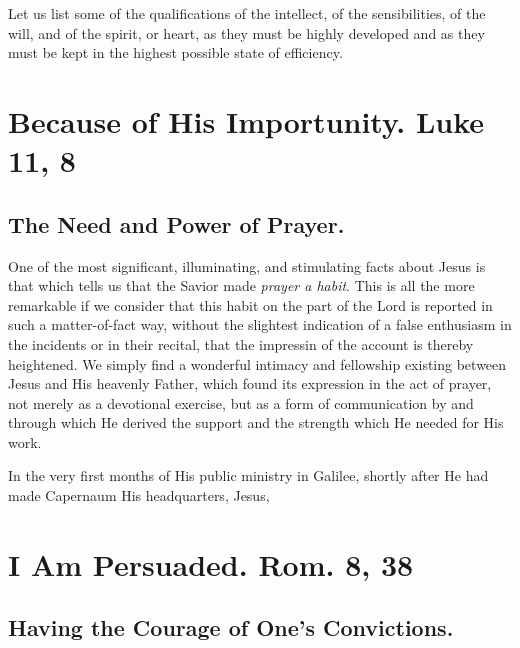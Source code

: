 \documentclass[
]{book}
\begin{document}
Let us list some of the qualifications of the intellect, of the sensibilities, of the will, and of the spirit, or heart, as they must be highly developed and as they must be kept in the highest possible state of efficiency.

\hypertarget{because-of-his-importunity.-luke-11-8}{%
\chapter{Because of His Importunity. Luke 11, 8}\label{because-of-his-importunity.-luke-11-8}}

\hypertarget{the-need-and-power-of-prayer.}{%
\section*{The Need and Power of Prayer.}\label{the-need-and-power-of-prayer.}}

One of the most significant, illuminating, and stimulating facts about Jesus is that which tells us that the Savior made \emph{prayer a habit}. This is all the more remarkable if we consider that this habit on the part of the Lord is reported in such a matter-of-fact way, without the slightest indication of a false enthusiasm in the incidents or in their recital, that the impressin of the account is thereby heightened. We simply find a wonderful intimacy and fellowship existing between Jesus and His heavenly Father, which found its expression in the act of prayer, not merely as a devotional exercise, but as a form of communication by and through which He derived the support and the strength which He needed for His work.

In the very first months of His public ministry in Galilee, shortly after He had made Capernaum His headquarters, Jesus,

\hypertarget{i-am-persuaded.-rom.-8-38}{%
\chapter{I Am Persuaded. Rom. 8, 38}\label{i-am-persuaded.-rom.-8-38}}

\hypertarget{having-the-courage-of-ones-convictions.}{%
\section*{Having the Courage of One's Convictions.}\label{having-the-courage-of-ones-convictions.}}
\end{document}
